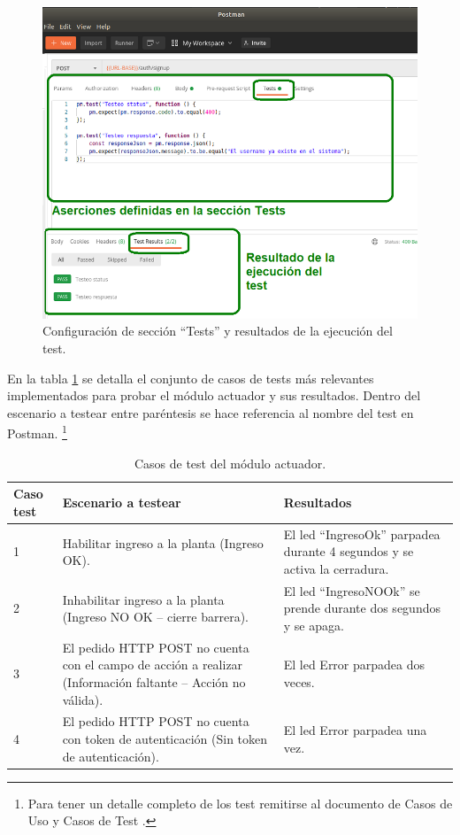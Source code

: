 \begin{figure}[ht]
	\centering
	\includegraphics[width=1\textwidth]{./Figures/PostmanAsercion.png}
	\caption{Configuración de sección ``Tests'' y resultados de la ejecución del test.}
	\label{fig:PostmanAsercion}
\end{figure}

En la tabla  \ref{tab:tablaTestNodActuador} se detalla el conjunto de casos de tests más relevantes implementados para probar el módulo actuador y sus resultados. Dentro del escenario a testear entre paréntesis se hace referencia al nombre del test en Postman. \footnote{Para tener un detalle completo de los test remitirse al documento de Casos de Uso y Casos de Test \citep{WEBSITE:CasosUsoYTest}.}

\begin{table}[h]
	\centering
	\caption[Casos de test del módulo actuador]{Casos de test del módulo actuador.}
	\begin{tabular}{p{1.5cm} p{6.5cm} p{4.5cm}} 	

		\toprule
		\textbf{Caso test} & 
		\textbf{Escenario a testear} & 
		\textbf{Resultados} 
		\\
		\midrule
1 & Habilitar ingreso a la planta (Ingreso OK). & El led ``IngresoOk'' parpadea durante 4 segundos y se activa la cerradura. \\
2 & Inhabilitar ingreso a la planta (Ingreso NO OK – cierre barrera).	& El led ``IngresoNOOk'' se prende durante dos segundos y se apaga. \\
3 & El pedido HTTP POST no cuenta con el campo de acción a realizar (Información faltante – Acción no válida). & El led Error parpadea dos veces. \\
4 & El pedido HTTP POST no cuenta con token de autenticación (Sin token de autenticación). & El led Error parpadea una vez. \\	   
		\bottomrule
		\hline
	\end{tabular}
	\label{tab:tablaTestNodActuador}
\end{table}

